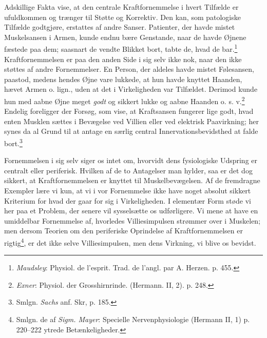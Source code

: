 \documentclass[12pt,a4paper,openany]{book}
\newcommand{\opage}[1]{\marginnote{\footnotesize\textit{[#1]}}}
\begin{document}
Adskillige Fakta vise, at den centrale Kraftfornemmelse i hvert Tilfælde
er ufuldkommen og trænger til Støtte og Korrektiv. Den kan, som
patologiske Tilfælde godtgjøre, erstattes af andre Sanser. Patienter,
der havde mistet Muskelsansen i Armen, kunde endnu bære Genstande, naar
de havde Øjnene fæstede paa dem; saasnart de vendte Blikket bort, tabte
de, hvad de bar.\footnote[3]{\emph{Maudsley}: Physiol. de l’esprit.
Trad. de l’angl. par A. Herzen. p. 455.} Kraftfornemmelsen er paa den
anden Side i sig selv ikke nok, naar den ikke støttes af andre
Fornemmelser. En Person, der aldeles havde mistet Følesansen, paastod,
medens hendes Øjne vare lukkede, at hun havde knyttet Haanden, hævet
Armen o. lign., uden at det i Virkeligheden var Tilfældet. Derimod kunde
hun med aabne Øjne meget \emph{godt} og sikkert lukke og aabne Haanden
o. s. v.\footnote[4]{\emph{Exner}: Physiol. der Grosshirnrinde.
(Hermann. II, 2). p. 248.} Endelig foreligger der Forsøg, som vise, at
Kraftsansen fungerer
\opage{147}lige godt, hvad enten Musklen sættes i Bevægelse ved Villien
eller ved elektrisk Paavirkning; her synes da al Grund til at antage en
særlig central Innervationsbevidsthed at falde bort.\footnote[1]{Smlgn.
\emph{Sachs} anf. Skr, p. 185.}

Fornemmelsen i sig selv siger os intet om, hvorvidt dens fysiologiske
Udspring er centralt eller periferisk. Hvilken af de to Antagelser man
hylder, saa er det dog sikkert, at Kraftfornemmelsen er knyttet til
Muskelbevægelsen. Af de fremdragne Exempler lære vi kun, at vi i vor
Fornemmelse ikke have noget absolut sikkert Kriterium for hvad der gaar
for sig i Virkeligheden. I elementær Form støde vi her paa et Problem,
der senere vil sysselsætte os udførligere. Vi mene at have en umiddelbar
Fornemmelse af, hvorledes Villiesimpulsen strømmer over i Muskelen; men
dersom Teorien om den periferiske Oprindelse af Kraftfornemmelsen er
rigtig\footnote[2]{Smlgn. de af \emph{Sigm. Mayer}: Specielle
Nervenphysiologie (Hermann II, 1) p. 220--222 ytrede Betænkeligheder.},
er det ikke selve Villiesimpulsen, men dens Virkning, vi blive os
bevidst.
\end{document}
